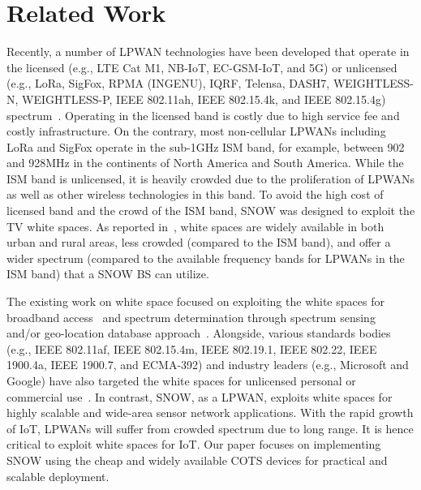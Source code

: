 
\section{Related Work}\label{sec:related}
Recently, a number of LPWAN technologies have been developed that operate in the licensed (e.g., LTE Cat M1, NB-IoT, EC-GSM-IoT, and 5G) or unlicensed (e.g., LoRa, SigFox, RPMA (INGENU), IQRF, Telensa,  DASH7, WEIGHTLESS-N, WEIGHTLESS-P, IEEE 802.11ah, IEEE 802.15.4k, and IEEE 802.15.4g) spectrum~\cite{ismail2018low, whitespaceSurvey, saxena2016achievable, chen2017narrowband, gozalvez2016new, akpakwu2017survey, kouvelas2020p}.
Operating in the licensed band is costly due to high service fee and costly infrastructure. 
On the contrary, most non-cellular LPWANs including LoRa and SigFox operate in the sub-1GHz ISM band, for example, between 902 and 928MHz in the continents of North America and South America. While the ISM band is unlicensed, it is heavily crowded due to the proliferation of LPWANs as well as other wireless technologies in this band. 
To avoid the high cost of licensed band and the crowd of the ISM band, SNOW was designed to exploit the TV white spaces. As reported in~\cite{whitespaceSurvey, ismail2018low, snow2, ws_sigcomm09},
white spaces are widely available in both urban and rural areas, less crowded (compared to the ISM band), and offer a wider spectrum (compared to the available frequency bands for LPWANs in the ISM band) that a SNOW BS can utilize.

The existing work on white space focused on exploiting the white spaces for broadband access~\cite{whitespaceSurvey, zhang2015design, hasan2014gsm, kumar, harrison2015whitespace, ws_sigcomm09, WATCH, videostreaming, linkasymmetry, vehiclebased, ws_mobicom13, ws_nsdi10} and spectrum determination through spectrum sensing~\cite{saeed2017local, ws_dyspan08_kim, ws_mobicom08, ws_dyspan11, FIWEX} and/or geo-location database approach~\cite{database1, database2, database3, vehiclebased, hysim}. 
Alongside, various standards bodies (e.g., IEEE 802.11af, IEEE 802.15.4m, IEEE 802.19.1, IEEE 802.22, IEEE 1900.4a, IEEE 1900.7, and ECMA-392) and industry leaders (e.g., Microsoft and Google) have also targeted the white spaces for unlicensed personal or commercial use~\cite{kocks2012spectrum, MSRAfrica, ismail2018low, whitespaceSurvey}. In contrast, SNOW, as a LPWAN, exploits white spaces for highly scalable and wide-area sensor network applications.
With the rapid growth of IoT,  LPWANs will suffer from crowded spectrum due to long range. It is hence critical to exploit white spaces for IoT. 
Our paper focuses on implementing SNOW using the cheap and widely available COTS devices for practical and scalable deployment.




